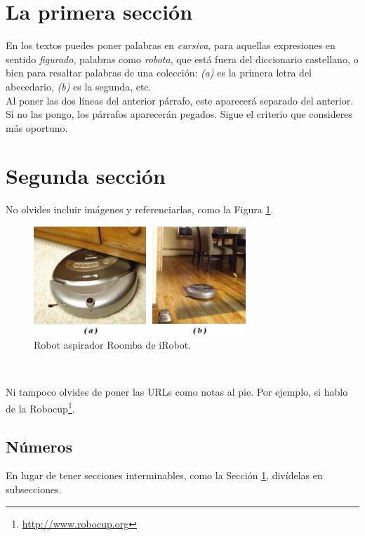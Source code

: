 \section{La primera sección}
\label{sec:miseccion} %

En los textos puedes poner palabras en \textit{cursiva}, para aquellas expresiones en sentido \textit{figurado}, palabras como \textit{robota}, que está fuera del diccionario castellano, o bien para resaltar palabras de una colección: \textit{(a)} es la primera letra del abecedario, \textit{(b)} es la segunda, etc.\\

Al poner las dos líneas del anterior párrafo, este aparecerá separado del anterior. Si no las pongo, los párrafos aparecerán pegados. Sigue el criterio que consideres más oportuno.

\section{Segunda sección}
\label{sec:segundaseccion}

No olvides incluir imágenes y referenciarlas, como la Figura \ref{fig:roomba}.

\begin{figure} [h!]
  \begin{center}
    \includegraphics[width=8cm]{figs/roomba}
  \end{center}
  \caption{Robot aspirador Roomba de iRobot.}
  \label{fig:roomba}
\end{figure}\

Ni tampoco olvides de poner las URLs como notas al pie. Por ejemplo, si hablo de la Robocup\footnote{\url{http://www.robocup.org}}.

\subsection{Números}
\label{sec:subseccion}

En lugar de tener secciones interminables, como la Sección \ref{sec:miseccion}, divídelas en subsecciones.

